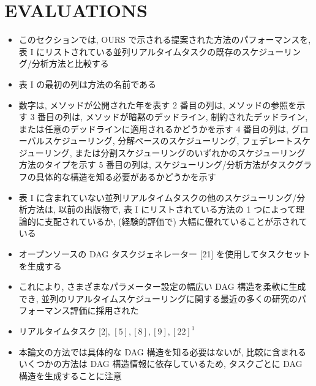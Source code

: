 
\section{EVALUATIONS}
\label{sec: evaluations}

\begin{frame}{}
    \begin{itemize}
        \item このセクションでは, OURS で示される提案された方法のパフォーマンスを, 表 I にリストされている並列リアルタイムタスクの既存のスケジューリング/分析方法と比較する
\item 表 I の最初の列は方法の名前である
\item 数字は, メソッドが公開された年を表す 2 番目の列は, メソッドの参照を示す 3 番目の列は, メソッドが暗黙のデッドライン, 制約されたデッドライン, または任意のデッドラインに適用されるかどうかを示す 4 番目の列は, グローバルスケジューリング, 分解ベースのスケジューリング, フェデレートスケジューリング, または分割スケジューリングのいずれかのスケジューリング方法のタイプを示す 5 番目の列は, スケジューリング/分析方法がタスクグラフの具体的な構造を知る必要があるかどうかを示す
\item 表 I に含まれていない並列リアルタイムタスクの他のスケジューリング/分析方法は, 以前の出版物で, 表 I にリストされている方法の 1 つによって理論的に支配されているか, (経験的評価で) 大幅に優れていることが示されている
    \end{itemize}
\end{frame}

\begin{frame}{}
    \begin{itemize}
        \item オープンソースの DAG タスクジェネレーター [21] を使用してタスクセットを生成する
\item これにより, さまざまなパラメーター設定の幅広い DAG 構造を柔軟に生成でき, 並列のリアルタイムスケジューリングに関する最近の多くの研究のパフォーマンス評価に採用された
\item リアルタイムタスク [2], $[5],[8],[9],[22]^{1}$ 
\item 本論文の方法では具体的な DAG 構造を知る必要はないが, 比較に含まれるいくつかの方法は DAG 構造情報に依存しているため, タスクごとに DAG 構造を生成することに注意
    \end{itemize}
\end{frame}

